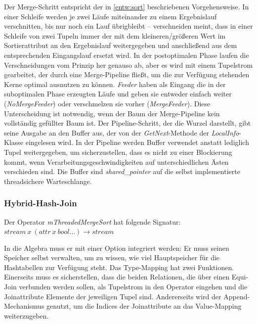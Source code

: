 \documentclass[a4paper,12pt,twoside]{article}
\newcommand{\Fb}[1]{\textit{#1}} %
\begin{document}
Der Merge-Schritt entspricht der in \autoref{entw:sort} beschriebenen Vorgehensweise. In einer Schleife werden je zwei Läufe miteinander zu einem Ergebnislauf verschnitten, bis nur noch ein Lauf übrigbleibt -- verschneiden meint, dass in einer Schleife von zwei Tupeln immer der mit dem kleineren/größeren Wert im Sortierattribut an den Ergebnislauf weitergegeben und anschließend aus dem entsprechenden Eingangslauf ersetzt wird. In der postoptimalen Phase laufen die Verschneidungen vom Prinzip her genauso ab, aber es wird mit einem Tupelstrom gearbeitet, der durch eine Merge-Pipeline fließt, um die zur Verfügung stehenden Kerne optimal ausnutzen zu können. \Fb{Feeder} haben als Eingang die in der suboptimalen Phase erzeugten Läufe und geben sie entweder einfach weiter (\Fb{NoMergeFeeder}) oder verschmelzen sie vorher (\Fb{MergeFeeder}). Diese Unterscheidung ist notwendig, wenn der Baum der Merge-Pipeline kein vollständig gefüllter Baum ist. Der Pipeline-Schritt, der die Wurzel darstellt, gibt seine Ausgabe an den Buffer aus, der von der \Fb{\Fb{GetNext}}-Methode der \Fb{\Fb{LocalInfo}}-Klasse eingelesen wird. In der Pipeline werden Buffer verwendet anstatt lediglich Tupel weitergegeben, um sicherzustellen, dass es nicht zu einer Blockierung kommt, wenn Verarbeitungsgeschwindigkeiten auf unterschiedlichen Ästen verschieden sind. Die Buffer sind \Fb{shared\_pointer} auf die selbst implementierte threadsichere Warteschlange.  


\subsubsection{Hybrid-Hash-Join}
\label{impl:hybrid}

Der Operator \Fb{mThreadedMergeSort} hat folgende Signatur: \newline
$stream~x~(attr~x~bool \ldots) \longrightarrow stream$

In die Algebra muss er mit einer Option integriert werden: Er muss seinen Speicher selbst verwalten, um zu wissen, wie viel Hauptspeicher für die Hashtabellen zur Verfügung steht. Das Type-Mapping hat zwei Funktionen. Einerseits muss es sicherstellen, dass die beiden Relationen, die über einen Equi-Join verbunden werden sollen, als Tupelstrom in den Operator eingehen und die Joinattribute Elemente der jeweiligen Tupel sind. Andererseits wird der Append-Mechanismus genutzt, um die Indices der Joinattribute an das Value-Mapping weiterzugeben.
\end{document}
